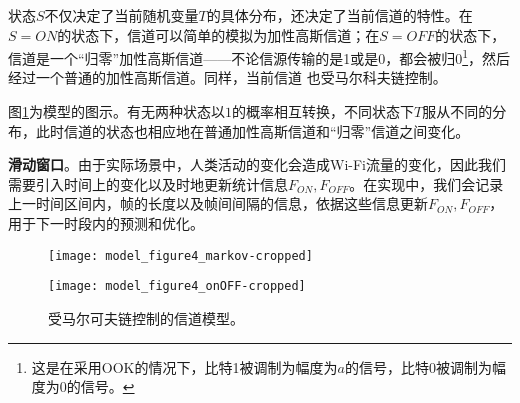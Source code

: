 状态$S$不仅决定了当前随机变量$T$的具体分布，还决定了当前信道的特性。在$S = ON$的状态下，信道可以简单的模拟为加性高斯信道；在$S = OFF$的状态下，信道是一个“归零”加性高斯信道——不论信源传输的是1或是0，都会被归0\footnote{这是在采用OOK的情况下，比特1被调制为幅度为$a$的信号，比特0被调制为幅度为0的信号。}，然后经过一个普通的加性高斯信道。同样，当前信道
也受马尔科夫链控制。

图\ref{fig:markov_model}为模型的图示。有无两种状态以$1$的概率相互转换，不同状态下$T$服从不同的分布，此时信道的状态也相应地在普通加性高斯信道和“归零”信道之间变化。

\textbf{滑动窗口}。由于实际场景中，人类活动的变化会造成Wi-Fi流量的变化，因此我们需要引入时间上的变化以及时地更新统计信息$F_{ON},F_{OFF}$。在实现中，我们会记录上一时间区间内，帧的长度以及帧间间隔的信息，依据这些信息更新$F_{ON},F_{OFF}$，用于下一时段内的预测和优化。
\begin{figure}[t]
	\begin{minipage}[b]{.5\linewidth}
		\texttt{[image: model\_figure4\_markov-cropped]}
		\label{fig:markov_chain}
	\end{minipage}
	\hfill
	\begin{minipage}[b]{.5\linewidth}
		\texttt{[image: model\_figure4\_onOFF-cropped]}
		\label{fig:series}
	\end{minipage}
	\caption{受马尔可夫链控制的信道模型。}\label{fig:markov_model}
\end{figure}